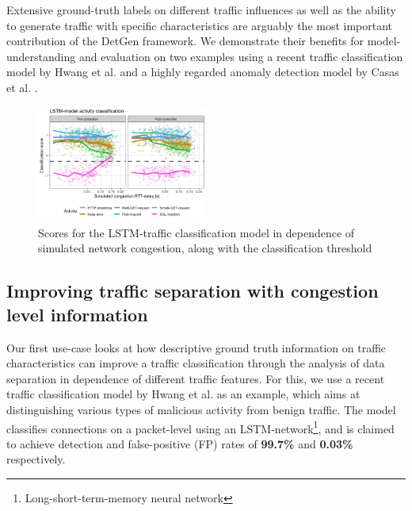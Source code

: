 \documentclass[conference]{IEEEtran}
\begin{document}

Extensive ground-truth labels on different traffic influences as well as the ability to generate traffic with specific characteristics are arguably the most important contribution of the DetGen framework. We demonstrate their benefits for model-understanding and evaluation on two examples using a recent traffic classification model by Hwang et al. \cite{hwang2019lstm} and a highly regarded anomaly detection model by Casas et al. \cite{casas2012unsupervised}.

\begin{figure}
\centering
\includegraphics[width=0.5\textwidth]{images/LSTM_exp.png}
\caption{Scores for the LSTM-traffic classification model in dependence of simulated network congestion, along with the classification threshold}\label{fig:LSTM_exp}
\end{figure}

\subsection{Improving traffic separation with congestion level information}
Our first use-case looks at how descriptive ground truth information on traffic characteristics can improve a traffic classification through the analysis of data separation in dependence of different traffic features. For this, we use a recent traffic classification model by Hwang et al. \cite{hwang2019lstm} as an example, which aims at distinguishing various types of malicious activity from benign traffic.
The model classifies connections on a packet-level using an LSTM-network\footnote{Long-short-term-memory neural network}, and is claimed to achieve detection and false-positive (FP) rates of \textbf{99.7\%} and \textbf{0.03\%} respectively. 
\end{document}
